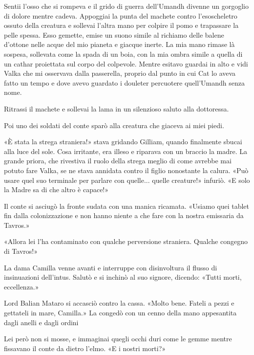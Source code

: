 Sentii l'osso che si rompeva e il grido di guerra dell'Umandh divenne un
gorgoglio di dolore mentre cadeva. Appoggiai la punta del machete contro
l'esoscheletro ossuto della creatura e sollevai l'altra mano per colpire
il pomo e trapassare la pelle spessa. Esso gemette, emise un suono
simile al richiamo delle balene d'ottone nelle acque del mio pianeta e
giacque inerte. La mia mano rimase là sospesa, sollevata come la spada
di un boia, con la mia ombra simile a quella di un cathar proiettata sul
corpo del colpevole. Mentre esitavo guardai in alto e vidi Valka che mi
osservava dalla passerella, proprio dal punto in cui Cat lo aveva fatto
un tempo e dove avevo guardato i douleter percuotere quell'Umandh senza
nome.

Ritrassi il machete e sollevai la lama in un silenzioso saluto alla
dottoressa.

Poi uno dei soldati del conte sparò alla creatura che giaceva ai miei
piedi.

\begin{figure}
	\centering
	\def\svgwidth{\columnwidth}
	\scalebox{0.2}{}
\end{figure}

«È stata la strega straniera!» stava gridando Gilliam, quando finalmente
sbucai alla luce del sole. Cosa irritante, era illeso e riparava con un
braccio la madre. La grande priora, che rivestiva il ruolo della strega
meglio di come avrebbe mai potuto fare Valka, se ne stava annidata
contro il figlio nonostante la calura. «Può usare quel suo terminale per
parlare con quelle... quelle creature!» infuriò. «E solo la Madre sa di
che altro è capace!»

Il conte si asciugò la fronte sudata con una manica ricamata. «Usiamo
quei tablet fin dalla colonizzazione e non hanno niente a che fare con
la nostra emissaria da Tavros.»

«Allora lei l'ha contaminato con qualche perversione straniera. Qualche
congegno di Tavros!»

La dama Camilla venne avanti e interruppe con disinvoltura il flusso di
insinuazioni dell'intus. Salutò e si inchinò al suo signore, dicendo:
«Tutti morti, eccellenza.»

Lord Balian Mataro si accasciò contro la cassa. «Molto bene. Fateli a
pezzi e gettateli in mare, Camilla.» La congedò con un cenno della mano
appesantita dagli anelli e dagli ordini

Lei però non si mosse, e immaginai quegli occhi duri come le gemme
mentre fissavano il conte da dietro l'elmo. «E i nostri morti?»

